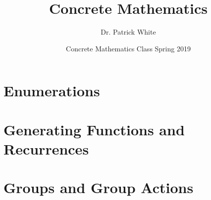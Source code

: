 \documentclass[12pt, titlepage]{article}
\title{Concrete Mathematics}
\author{Dr. Patrick White}
\date{Concrete Mathematics Class Spring 2019} %
\begin{document}
\maketitle

\tableofcontents

\newpage 



\newpage
 


\newpage 

\part{Enumerations}













 







\newpage   

\part{Generating Functions and Recurrences}
























\newpage 
\part{Groups and Group Actions}

\end{document}
